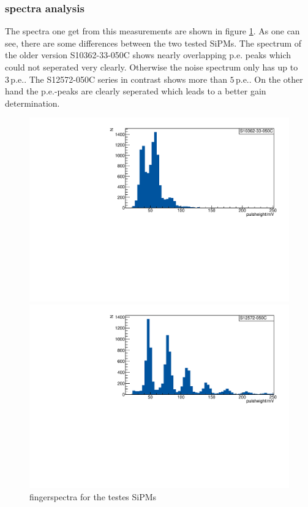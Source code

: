 \subsubsection{spectra analysis}
The spectra one get from this measurements are shown in figure \ref{fingerspecs}. As one can see, there are some differences between the two tested SiPMs. The spectrum of the older version S10362-33-050C shows nearly overlapping p.e. peaks which could not seperated very clearly. Otherwise the noise spectrum only has up to $3\,\mathrm{p.e.}$. The S12572-050C series in contrast shows more than $5\,\mathrm{p.e.}$. On the other hand the p.e.-peaks are clearly seperated which leads to a better gain determination.
\begin{figure}[h]
	\centering
	\begin{minipage}[b]{0.49\textwidth}
		\includegraphics[width = .99\textwidth]{Figures/radermacher/S10362-33-050C.pdf}
	\end{minipage}
	\begin{minipage}[b]{0.49\textwidth}
		\includegraphics[width = .99\textwidth]{Figures/radermacher/S12572-050C.pdf}
	\end{minipage}
	\caption{fingerspectra for the testes SiPMs}
	\label{fingerspecs}
\end{figure}
